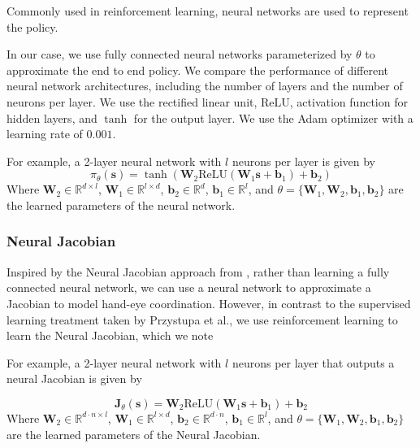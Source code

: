 \documentclass[letterpaper, 10 pt, conference]{ieeeconf}  %
\begin{document}
Commonly used in reinforcement learning, neural networks are used to represent
the policy.

In our case, we use fully
connected neural networks parameterized by $\theta$ to approximate the end to
end policy. We compare the performance of different neural network
architectures, including the number of layers and the number of neurons per
layer. We use the rectified linear unit, $\text{ReLU}$,
activation function for hidden layers, and $\tanh$ for the output layer. We use
the Adam optimizer with a learning rate of $0.001$.

For example, a 2-layer neural network with $l$ neurons per layer is given by
\begin{equation}
    \pi_\theta(\mathbf{s}) = \tanh(\mathbf{W}_2 \text{ReLU}(\mathbf{W}_1 \mathbf{s} + \mathbf{b}_1) + \mathbf{b}_2)
\end{equation}
Where $\mathbf{W}_2 \in \mathbb{R}^{d \times l}$, $\mathbf{W}_1 \in \mathbb{R}^{l \times d}$,
$\mathbf{b}_2 \in \mathbb{R}^{d}$, $\mathbf{b}_1 \in \mathbb{R}^{l}$, and
$\theta = \{\mathbf{W}_1, \mathbf{W}_2, \mathbf{b}_1, \mathbf{b}_2\}$
are the learned parameters of the neural network.

\subsubsection{Neural Jacobian}

Inspired by the Neural Jacobian approach from \cite{Przystupa2021}, rather than
learning a fully connected neural network, we can use a neural network to
approximate a Jacobian to model hand-eye coordination. However, in contrast to
the supervised learning treatment taken by Przystupa et al., we use
reinforcement learning to learn the Neural Jacobian, which we note

For example, a 2-layer neural network with $l$ neurons per layer that outputs
a neural Jacobian is given by

\begin{equation}
    \mathbf{J}_\theta(\mathbf{s}) = \mathbf{W}_2 \text{ReLU}(\mathbf{W}_1 \mathbf{s} + \mathbf{b}_1) + \mathbf{b}_2
\end{equation}
Where $\mathbf{W}_2 \in \mathbb{R}^{d \cdot n \times l}$, $\mathbf{W}_1 \in \mathbb{R}^{l \times d}$,
$\mathbf{b}_2 \in \mathbb{R}^{d \cdot n}$, $\mathbf{b}_1 \in \mathbb{R}^{l}$, and
$\theta = \{\mathbf{W}_1, \mathbf{W}_2, \mathbf{b}_1, \mathbf{b}_2\}$
are the learned parameters of the Neural Jacobian.
\end{document}
